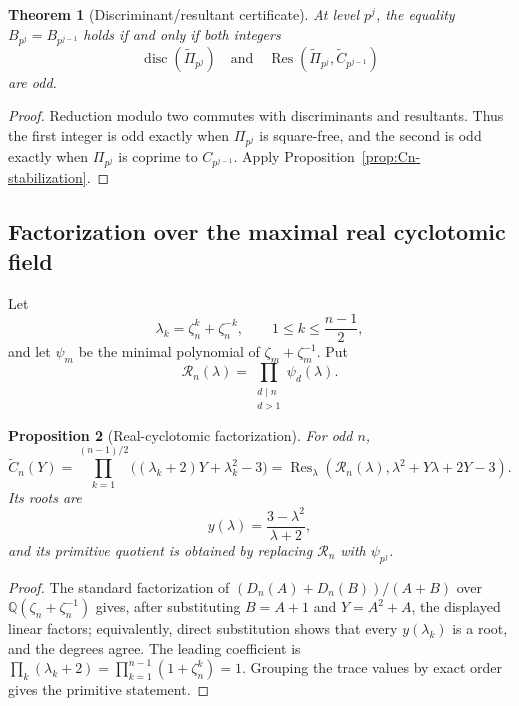 \documentclass[a4paper]{article}
\newtheorem{theorem}{Theorem}[section]
\newtheorem{proposition}[theorem]{Proposition}
\newcommand{\Q}{\mathbb{Q}}
\DeclareMathOperator{\Res}{Res}
\begin{document}
\begin{theorem}[Discriminant/resultant certificate]
\label{thm:integer-certificate}
	At level $p^j$, the equality
	$B_{p^j}=B_{p^{j-1}}$ holds if and only if both integers
	\[
		\operatorname{disc}(\widetilde\Pi_{p^j})
		\quad\text{and}\quad
		\Res(\widetilde\Pi_{p^j},\widetilde C_{p^{j-1}})
	\]
	are odd.
\end{theorem}

\begin{proof}
	Reduction modulo two commutes with discriminants and resultants.
	Thus the first integer is odd exactly when $\Pi_{p^j}$ is square-free,
	and the second is odd exactly when $\Pi_{p^j}$ is coprime to
	$C_{p^{j-1}}$.  Apply Proposition~\ref{prop:Cn-stabilization}.
\end{proof}

\subsection{Factorization over the maximal real cyclotomic field}

Let
\[
	\lambda_k=\zeta_n^k+\zeta_n^{-k},
	\qquad
	1\leq k\leq\frac{n-1}{2},
\]
and let $\psi_m$ be the minimal polynomial of
$\zeta_m+\zeta_m^{-1}$.  Put
\[
	\mathcal R_n(\lambda)=\prod_{\substack{d\mid n\\d>1}}\psi_d(\lambda).
\]

\begin{proposition}[Real-cyclotomic factorization]
\label{prop:real-factorization}
	For odd $n$,
	\begin{equation}\label{eq:real-factorization}
		\widetilde C_n(Y)
		=\prod_{k=1}^{(n-1)/2}
		 \bigl((\lambda_k+2)Y+\lambda_k^2-3\bigr)
		=\Res_\lambda\!\left(
			\mathcal R_n(\lambda),
			\lambda^2+Y\lambda+2Y-3
		\right).
	\end{equation}
	Its roots are
	\[
		y(\lambda)=\frac{3-\lambda^2}{\lambda+2},
	\]
	and its primitive quotient is obtained by replacing
	$\mathcal R_n$ with $\psi_{p^j}$.
\end{proposition}

\begin{proof}
	The standard factorization of
	$(D_n(A)+D_n(B))/(A+B)$ over
	$\Q(\zeta_n+\zeta_n^{-1})$ gives, after substituting
	$B=A+1$ and $Y=A^2+A$, the displayed linear factors; equivalently,
	direct substitution shows that every $y(\lambda_k)$ is a root, and
	the degrees agree.
	The leading coefficient is
	$\prod_k(\lambda_k+2)=\prod_{k=1}^{n-1}(1+\zeta_n^k)=1$.
	Grouping the trace values by exact order gives the primitive statement.
\end{proof}
\end{document}
